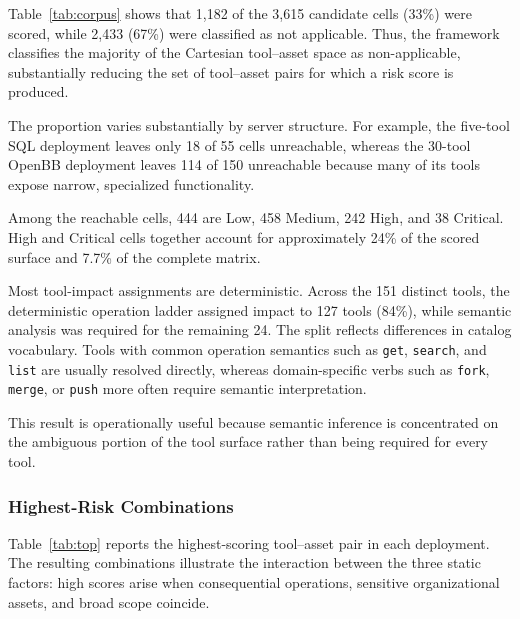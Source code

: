 \documentclass[sigconf]{acmart}
\begin{document}
Table~\ref{tab:corpus} shows that 1,182 of the 3,615 candidate cells
(33\%) were scored, while 2,433 (67\%) were classified as not applicable.
Thus, the framework classifies the majority of the Cartesian tool--asset space as non-applicable, substantially reducing the set of tool--asset pairs for which a risk score is produced.

The proportion varies substantially by server structure. For example, the
five-tool SQL deployment leaves only 18 of 55 cells unreachable, whereas the
30-tool OpenBB deployment leaves 114 of 150 unreachable because many of its
tools expose narrow, specialized functionality.

Among the reachable cells, 444 are Low, 458 Medium, 242 High, and 38
Critical. High and Critical cells together account for approximately 24\% of
the scored surface and 7.7\% of the complete matrix.


Most tool-impact assignments are deterministic. Across the 151 distinct tools, the deterministic operation ladder assigned
impact to 127 tools (84\%), while semantic analysis was required for the
remaining 24. The split reflects differences in catalog vocabulary. Tools with
common operation semantics such as \texttt{get}, \texttt{search}, and
\texttt{list} are usually resolved directly, whereas domain-specific verbs
such as \texttt{fork}, \texttt{merge}, or \texttt{push} more often require
semantic interpretation.

This result is operationally useful because semantic inference is concentrated
on the ambiguous portion of the tool surface rather than being required for
every tool.


\subsubsection{Highest-Risk Combinations}

Table~\ref{tab:top} reports the highest-scoring tool--asset pair in each
deployment. The resulting combinations illustrate the interaction between the
three static factors: high scores arise when consequential operations,
sensitive organizational assets, and broad scope coincide.
\end{document}
